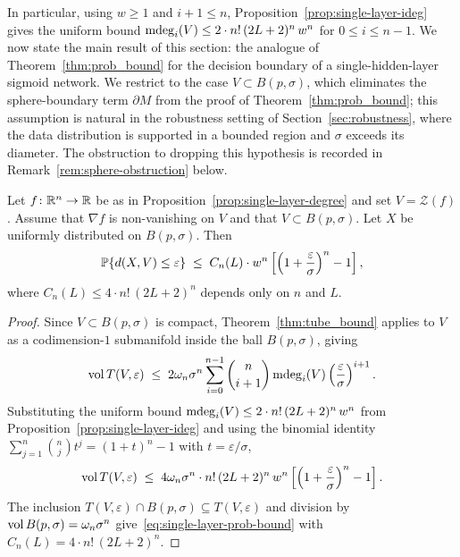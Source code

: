 In particular, using $w\ge 1$ and $i+1\le n$, Proposition~\ref{prop:single-layer-ideg} gives the uniform bound $\operatorname{\mathrm{mdeg}}_i(V)\le 2\cdot n!\,(2L+2)^n\,w^n$ for $0\le i\le n-1$. We now state the main result of this section: the analogue of Theorem~\ref{thm:prob_bound} for the decision boundary of a single-hidden-layer sigmoid network. We restrict to the case $V\subset B(p,\sigma)$, which eliminates the sphere-boundary term $\partial M$ from the proof of Theorem~\ref{thm:prob_bound}; this assumption is natural in the robustness setting of Section~\ref{sec:robustness}, where the data distribution is supported in a bounded region and $\sigma$ exceeds its diameter. The obstruction to dropping this hypothesis is recorded in Remark~\ref{rem:sphere-obstruction} below.

\begin{theorem}\label{thm:prob_bound_single_layer}
  Let $f\colon\mathbb{R}^n\to\mathbb{R}$ be as in Proposition~\ref{prop:single-layer-degree} and set $V=\mathcal{Z}(f)$. Assume that $\nabla f$ is non-vanishing on $V$ and that $V\subset B(p,\sigma)$. Let $X$ be uniformly distributed on $B(p,\sigma)$. Then
  \begin{equation}\label{eq:single-layer-prob-bound}
    \operatorname*{\mathbb{P}}\{d(X,V)\le\varepsilon\}
    \;\leq\; C_n(L)\cdot w^n\left[\left(1+\frac{\varepsilon}{\sigma}\right)^n - 1\right],
  \end{equation}
  where $C_n(L) \le 4\cdot n!\,(2L+2)^n$ depends only on $n$ and $L$.
\end{theorem}

\begin{proof}
  Since $V\subset B(p,\sigma)$ is compact, Theorem~\ref{thm:tube_bound} applies to $V$ as a codimension-$1$ submanifold inside the ball $B(p,\sigma)$, giving
  \begin{equation*}
    \operatorname{vol} T(V,\varepsilon)
    \;\leq\; 2\omega_n\sigma^n\sum_{i=0}^{n-1}\binom{n}{i+1}\operatorname{\mathrm{mdeg}}_i(V)\left(\frac{\varepsilon}{\sigma}\right)^{i+1}.
  \end{equation*}
  Substituting the uniform bound $\operatorname{\mathrm{mdeg}}_i(V)\le 2\cdot n!\,(2L+2)^n\,w^n$ from Proposition~\ref{prop:single-layer-ideg} and using the binomial identity $\sum_{j=1}^n\binom{n}{j}t^j=(1+t)^n-1$ with $t=\varepsilon/\sigma$,
  \begin{equation*}
    \operatorname{vol} T(V,\varepsilon)
    \;\leq\; 4\omega_n\sigma^n\cdot n!\,(2L+2)^n\,w^n\left[\left(1+\frac{\varepsilon}{\sigma}\right)^n-1\right].
  \end{equation*}
  The inclusion $T(V,\varepsilon)\cap B(p,\sigma)\subseteq T(V,\varepsilon)$ and division by $\operatorname{vol} B(p,\sigma)=\omega_n\sigma^n$ give~\eqref{eq:single-layer-prob-bound} with $C_n(L)=4\cdot n!\,(2L+2)^n$.
\end{proof}

